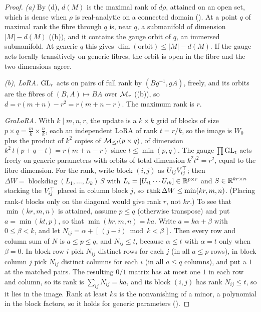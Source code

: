 \begin{proof}
\emph{(a)} By (d), $d(M)$ is the maximal rank of $d\rho$, attained on an open set, which is dense when $\rho$ is
real-analytic on a connected domain (). At a point $q$ of maximal rank the fibre through $q$ is, near $q$, a
submanifold of dimension $\lvert M\rvert-d(M)$ ((b)), and it contains the gauge orbit of $q$, an immersed
submanifold. At generic $q$ this gives $\dim(\text{orbit})\le\lvert M\rvert-d(M)$. If the gauge acts locally transitively on
generic fibres, the orbit is open in the fibre and the two dimensions agree.

\emph{(b), LoRA.} $\mathrm{GL}_r$ acts on pairs of full rank by $(Bg^{-1},gA)$, freely, and its orbits are the fibres of
$(B,A)\mapsto BA$ over $\mathcal{M}_r$ ((b)), so $d=r(m+n)-r^2=r(m+n-r)$. The maximum rank is $r$.

\emph{GraLoRA.} With $k\mid m,n,r$, the update is a $k\times k$ grid of blocks of size $p\times q=\tfrac mk\times\tfrac nk$, each
an independent LoRA of rank $t=r/k$, so the image is $W_0$ plus the product of $k^2$ copies of
$\mathcal{M}_{\le t}(p\times q)$, of dimension $k^2\,t(p+q-t)=r(m+n-r)$ since $t\le\min(p,q)$. The gauge $\prod\mathrm{GL}_t$ acts freely on
generic parameters with orbits of total dimension $k^2t^2=r^2$, equal to the fibre dimension. For the rank, write block
$(i,j)$ as $U_{ij}V_{ij}^{\top}$; then $\Delta W=\operatorname{blockdiag}(L_1,\dots,L_k)\,S$ with
$L_i=[U_{i1}\cdots U_{ik}]\in\mathbb{R}^{p\times r}$ and $S\in\mathbb{R}^{kr\times n}$ stacking the $V_{ij}^{\top}$ placed in column block $j$, so
$\operatorname{rank}\Delta W\le\min(kr,m,n)$. (Placing rank-$t$ blocks only on the diagonal would give rank $r$, not $kr$.) To see that
$\min(kr,m,n)$ is attained, assume $p\le q$ (otherwise transpose) and put $a=\min(kt,p)$, so that
$\min(kr,m,n)=ka$. Write $a=k\alpha+\beta$ with $0\le\beta<k$, and let $N_{ij}=\alpha+[\,(j-i)\bmod k<\beta\,]$. Then every
row and column sum of $N$ is $a\le p\le q$, and $N_{ij}\le t$, because $\alpha\le t$ with $\alpha=t$ only when $\beta=0$. In
block row $i$ pick $N_{ij}$ distinct rows for each $j$ (in all $a\le p$ rows), in block column $j$ pick $N_{ij}$ distinct
columns for each $i$ (in all $a\le q$ columns), and put a $1$ at the matched pairs. The resulting $0/1$ matrix has at most
one $1$ in each row and column, so its rank is $\sum_{ij}N_{ij}=ka$, and its block $(i,j)$ has rank $N_{ij}\le t$, so it lies
in the image. Rank at least $ka$ is the nonvanishing of a minor, a polynomial in the block factors, so it holds for generic
parameters ().


\end{proof}
